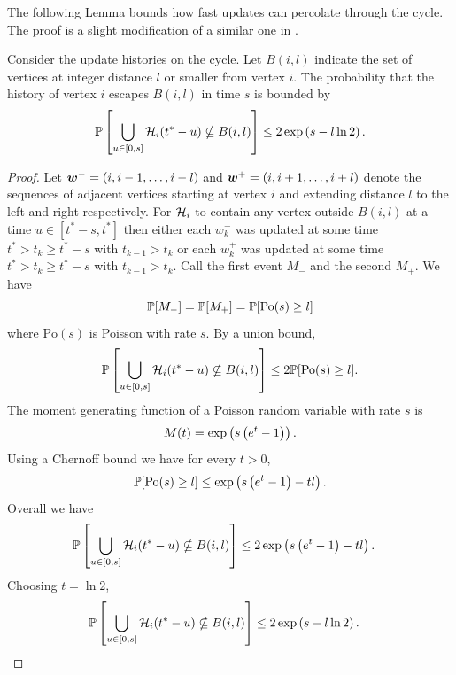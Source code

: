 	The following Lemma bounds how fast updates can percolate through the cycle. The proof is a slight modification of a similar one in \cite{Lubetzky2016-wd}.
	\begin{lemma}
	\label{lem:1D prob history contained in ball}
		Consider the update histories on the cycle.	Let $B(i, l)$ indicate the set of vertices at integer distance $l$ or smaller from vertex $i$. The probability that the history of vertex $i$ escapes $B(i,l)$ in time $s$ is bounded by
		\begin{equation}
			\mathbb{P}\left[\bigcup_{u \in [0, s]}\mathcal{H}_i(t^* - u) \nsubseteq B(i, l)\right] \leq 2\exp\left(s - l \ln 2 \right).
		\end{equation}
	\end{lemma}
	\begin{proof}
		Let ${\bm{{w}}}^- = (i, i-1, \dots, i- l)$ and ${\bm{{w}}}^+ = (i, i+1, \dots, i+ l)$ denote the sequences of adjacent vertices starting at vertex $i$ and extending distance $l$ to the left and right respectively. For $\mathcal{H}_i$ to contain any vertex outside $B(i, l)$ at a time $u \in [t^* - s, t^*]$ then either each $w_k^-$ was updated at some time $t^* > t_k \geq t^* - s$ with $t_{k-1} > t_k$ or each $w_k^+$ was updated at some time $t^* > t_k \geq t^* - s$ with $t_{k-1} > t_k$. Call the first event $M_-$ and the second $M_+$. We have
		\begin{equation}
			\mathbb{P}[M_-] = \mathbb{P}[M_+] = \mathbb{P}[\mathrm{Po}(s) \geq  l ]
		\end{equation}
		where $\mathrm{Po}(s)$ is Poisson with rate $s$. By a union bound,
		\begin{equation}
			\mathbb{P}\left[\bigcup_{u \in [0, s]}\mathcal{H}_i(t^* - u) \nsubseteq B(i, l)\right] \leq 2 \mathbb{P}[\mathrm{Po}(s) \geq  l].
		\end{equation}
		The moment generating function of a Poisson random variable with rate $s$ is
		\begin{equation}
			M(t) = \exp\left(s\left(e^t - 1\right)\right).
		\end{equation}
		Using a Chernoff bound we have for every $t > 0$,
		\begin{equation}
			\mathbb{P}[\mathrm{Po}(s) \geq l] \leq \exp\left(s\left(e^t - 1\right) - t l\right).
		\end{equation}
		Overall we have
		\begin{align}
			\mathbb{P}\left[\bigcup_{u \in [0, s]}\mathcal{H}_i(t^* - u) \nsubseteq B(i, l)\right] &\leq 2\exp\left(s\left(e^t - 1\right) - t l\right).
		\end{align}
		Choosing $t = \ln 2$,
		\begin{align}
			\prob\left[\bigcup_{u \in [0, s]}\mathcal{H}_i(t^* - u) \nsubseteq B(i, l)\right] &\leq 2\exp\left(s - l \ln 2 \right).%
		\end{align}
	\end{proof}


